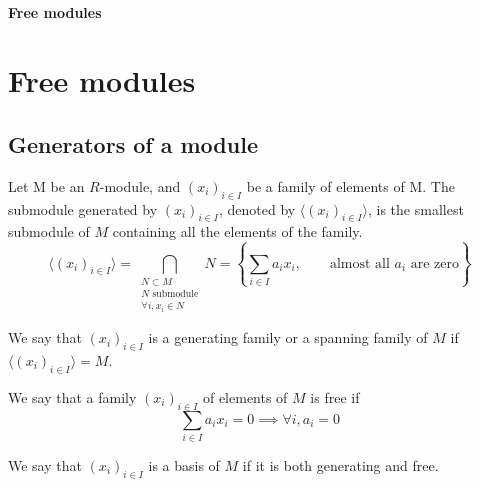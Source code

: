 \ifsolo
    ~

    \vspace{1cm}

    \begin{center}
        \textbf{\LARGE Free modules} \\[1em]
    \end{center}

    \vspace{1cm}

    \tableofcontents

    \vspace{1cm}

\else
    \chapter{Free modules}

    \minitoc
\fi
\thispagestyle{empty}

\section{Generators of a module}

\begin{dfn}
    Let M be an $R$-module, and $(x_i) _{i \in  I}$ be a family of elements of M. The submodule generated by $(x_i)_{i \in  I}$, denoted by $\langle (x_i)_{i \in  I}\rangle $, is the smallest submodule of $M$ containing all the elements of the family. \[\langle (x_i)_{i \in  I}\rangle = \bigcap_{\substack{N\subset M\\N\text{ submodule}\\ \forall i,x_i \in  N}}N = \left\{\sum_{i \in  I} a_ix_i, \qquad \text{almost all $a_i$ are zero}\right\}\]
\end{dfn}

\begin{dfn}
We say that $(x_i)_{i \in  I}$ is a generating family or a spanning family of $M$ if $\langle (x_i)_{i \in  I}\rangle = M$.
\end{dfn}

\begin{dfn}
    We say that a family $(x_i)_{i \in  I}$ of elements of $M$ is free if \[\sum_{i \in  I} a_i x_i=0 \implies \forall i,a_i=0\]
\end{dfn}

\begin{dfn}
We say that $(x_i)_{i \in  I}$ is a basis of $M$ if it is both generating and free.
\end{dfn}

